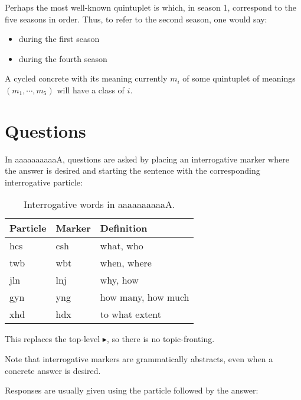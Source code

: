 \documentclass{book}
\newcommand{\lname}{aaaaaaaaaaA}
\begin{document}
Perhaps the most well-known quintuplet is  which, in season 1, correspond to the five seasons in order. Thus, to refer to the second season, one would say:

\begin{itemize}
  \item {} during the first season
  \item {} during the fourth season
\end{itemize}

A cycled concrete with its meaning currently $m_i$ of some quintuplet of meanings $(m_1, \cdots, m_5)$ will have a class of $i$.

\section{Questions}

In \lname{}, questions are asked by placing an interrogative marker where the answer is desired and starting the sentence with the corresponding interrogative particle:

\begin{table}[h]
  \caption{Interrogative words in \lname.}
  \centering
  \begin{tabular}{>{\kardinal}l>{\kardinal}ll}
    \textnormal{Particle} & \textnormal{Marker} & Definition \\
    \hline
    hcs & csh & what, who \\
    twb & wbt & when, where \\
    jln & lnj & why, how \\
    gyn & yng & how many, how much \\
    xhd & hdx & to what extent \\
  \end{tabular}
\end{table}

This replaces the top-level $\blacktriangleright$, so there is no topic-fronting.

Note that interrogative markers are grammatically abstracts, even when a concrete answer is desired.

Responses are usually given using the particle followed by the answer: \\
~\\
 \\
 \\
    \\
   \\
~\\
 \\
 \\
  \\
 \\
\end{document}
